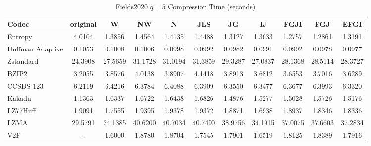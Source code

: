 \documentclass{article}
\begin{document}
\begin{table}[h!]
\centering
\caption{Fields2020 $q=5$ Compression Time (seconds)}
\begin{tabular}{|l|cccccccccc|}
\hline
Codec &  original &       W &      NW &       N &     JLS &      JG &      IJ &    FGJI &     FGJ &    EFGI \\
\hline
Entropy & 4.0104 & 1.3856 & 1.4564 & 1.4135 & 1.4488 & 1.3127 & 1.3633 & 1.2757 & 1.2861 & 1.3191         \\
\hline
Huffman Adaptive &    0.1053 &  0.1008 &  0.1006 &  0.0998 &  0.0992 &  0.0982 &  0.0991 &  0.0992 &  0.0978 &  0.0977 \\
Zstandard        &   24.3908 & 27.5659 & 31.1728 & 31.0194 & 31.3859 & 29.3287 & 27.0837 & 28.1368 & 28.5114 & 28.3727 \\
BZIP2            &    3.2055 &  3.8576 &  4.0138 &  3.8907 &  4.1418 &  3.8913 &  3.6812 &  3.6553 &  3.7016 &  3.6289 \\
CCSDS 123        &    6.2119 &  6.4216 &  6.3784 &  6.4088 &  6.3909 &  6.3550 &  6.3477 &  6.3677 &  6.3993 &  6.3320 \\
Kakadu           &    1.1363 &  1.6337 &  1.6722 &  1.6438 &  1.6826 &  1.4876 &  1.5277 &  1.5028 &  1.5726 &  1.5176 \\
LZ77Huff         &    1.9091 &  1.7555 &  1.9395 &  1.9378 &  1.9372 &  1.8871 &  1.6938 &  1.8937 &  1.8346 &  1.8336 \\
LZMA             &   29.5791 & 34.1385 & 40.6200 & 40.7034 & 40.7490 & 38.9756 & 34.1915 & 37.0075 & 37.6603 & 37.2834 \\
V2F              &    - &  1.6000 &  1.8780 &  1.8704 &  1.7545 &  1.7901 &  1.6519 &  1.8125 &  1.8389 &  1.7916 \\
\hline
\end{tabular}
\end{table}

\newpage
\end{document}
